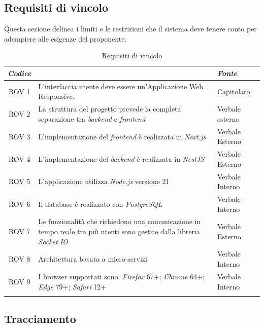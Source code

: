 \documentclass[12pt, oneside]{article}
\begin{document}
\subsection{Requisiti di vincolo}
Questa sezione delinea i limiti e le restrizioni che il sistema deve tenere conto per adempiere alle esigenze del proponente.
\begin{longtable}{|c|p{14cm}|p{2cm}|}
    \hline
    \emph{Codice} & \centering{\emph{Descrizione}} &  \emph{Fonte} \\
    \hline
    \endfirsthead
    \endhead
    ROV 1& L'interfaccia utente deve essere un'Applicazione Web Responsive.  & Capitolato  \\
    \hline
    ROV 2& La struttura del progetto prevede la completa separazione tra \textit{backend} e \textit{frontend}  & Verbale esterno  \\
    \hline
    ROV 3& L'implementazione del \textit{frontend} è realizzata in \textit{Next.js}  & Verbale Esterno  \\
    \hline
    ROV 4& L'implementazione del \textit{backend} è realizzata in \textit{NestJS}  & Verbale Esterno  \\
    \hline
    ROV 5& L'applicazione utilizza \textit{Node.js} versione 21 & Verbale Interno  \\
    \hline
    ROV 6& Il database è realizzato con \textit{PostgreSQL}  & Verbale Interno  \\
    \hline
    ROV 7& Le funzionalità che richiedono una comunicazione in tempo reale tra più utenti sono gestite dalla libreria \textit{Socket.IO}  & Verbale Esterno  \\
    \hline
    ROV 8& Architettura basata a micro-servizi & Verbale Interno  \\
    \hline
    ROV 9& I browser supportati sono: \textit{Firefox} 67+; \textit{Chrome} 64+; \textit{Edge} 79+; \textit{Safari} 12+  & Verbale Interno  \\
    \hline
\caption{Requisiti di vincolo}
\end{longtable}


\setlength{\extrarowheight}{8pt}
\subsection{Tracciamento}
\end{document}
